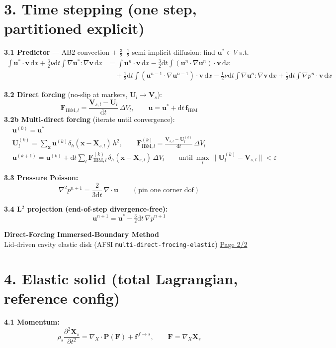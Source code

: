\documentclass[10pt]{article}
\newcommand{\dd}{\mathrm{d}}
\begin{document}
\section*{3. Time stepping (one step, partitioned explicit)}
\textbf{3.1 Predictor} — AB2 convection $+$ $\frac32$--$\frac12$ semi-implicit diffusion: find $\bm u^*\!\in\! V$ s.t.
\[
\begin{aligned}
\int\!\bm u^*\!\cdot\!\bm v\,\dd x+\tfrac32\nu\dd t\!\int\!\nabla \bm u^*\!:\!\nabla \bm v\,\dd x
&=\int\!\bm u^n\!\cdot\!\bm v\,\dd x
-\tfrac32\dd t\!\int\!(\bm u^n\!\cdot\!\nabla\bm u^n)\!\cdot\!\bm v\,\dd x\\
&\quad+\tfrac12\dd t\!\int\!(\bm u^{n-1}\!\cdot\!\nabla\bm u^{n-1})\!\cdot\!\bm v\,\dd x
-\tfrac12\nu\dd t\!\int\!\nabla\bm u^n\!:\!\nabla\bm v\,\dd x
+\tfrac12\dd t\!\int\!\nabla p^n\!\cdot\!\bm v\,\dd x
\end{aligned}
\]

\textbf{3.2 Direct forcing} (no-slip at markers, $\bm U_l \to \bm V_s$):
\[
\bm F_{\mathrm{IBM},l} = \frac{\bm V_{s,l}-\bm U_l}{\dd t}\,\Delta V_l,
\qquad \bm u = \bm u^* + \dd t\,\bm f_{\mathrm{IBM}}
\]
\textbf{3.2b Multi-direct forcing} (iterate until convergence):
\[
\begin{aligned}
&\bm u^{(0)}=\bm u^*\\
&\bm U_l^{(k)}=\sum_{\bm x}\bm u^{(k)}\delta_h(\bm x-\bm X_{s,l})\,h^2,\qquad
\bm F_{\mathrm{IBM},l}^{(k)}=\frac{\bm V_{s,l}-\bm U_l^{(k)}}{\dd t}\,\Delta V_l\\
&\bm u^{(k+1)}=\bm u^{(k)}+\dd t\sum_l\bm F_{\mathrm{IBM},l}^{(k)}\,\delta_h(\bm x-\bm X_{s,l})\,\Delta V_l
\qquad \text{until}\ \max_l\|\bm U_l^{(k)}-\bm V_{s,l}\|<\varepsilon
\end{aligned}
\]

\textbf{3.3 Pressure Poisson:}
\[
\nabla^2 p^{n+1} = \frac{2}{3\dd t}\,\nabla\!\cdot\!\bm u
\qquad (\text{pin one corner dof})
\]

\textbf{3.4 L$^2$ projection (end-of-step divergence-free):}
\[
\bm u^{n+1} = \bm u^* - \tfrac{3}{2}\dd t\,\nabla p^{n+1}
\]

\clearpage
\begin{center}
{\large\bf Direct-Forcing Immersed-Boundary Method}\\
Lid-driven cavity elastic disk \quad (AFSI \texttt{multi-direct-frocing-elastic}) \quad \underline{Page 2/2}
\end{center}

\section*{4. Elastic solid (total Lagrangian, reference config)}
\textbf{4.1 Momentum:}
\[
\rho_s\frac{\partial^2 \bm X_s}{\partial t^2} = \nabla_X\!\cdot\!\bm P(\bm F)+\bm f^{\,f\to s},
\qquad \bm F = \nabla_X \bm X_s
\]
\end{document}
